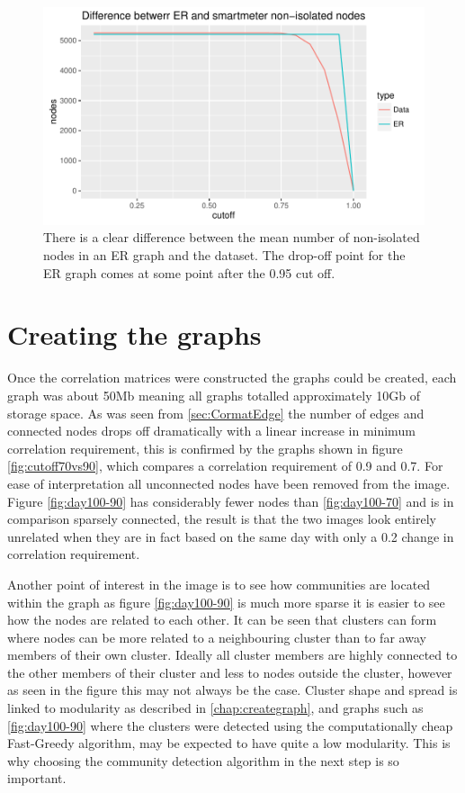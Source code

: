 \begin{figure}[ht]
    \centering
    \includegraphics{Figures/Results/DataVsER}
    \caption[ER \& Data edge comparison]{There is a clear difference between the mean number of non-isolated nodes in an ER graph and the dataset. The drop-off point for the ER graph comes at some point after the 0.95 cut off.}
    \label{fig:DataVsER}
\end{figure}

\section{Creating the graphs}
Once the correlation matrices were constructed the graphs could be created, each graph was about 50Mb meaning all graphs totalled approximately 10Gb of storage space. As was seen from \ref{sec:CormatEdge} the number of edges and connected nodes drops off dramatically with a linear increase in minimum correlation requirement, this is confirmed by the graphs shown in figure \ref{fig:cutoff70vs90}, which compares a correlation requirement of 0.9 and 0.7. For ease of interpretation all unconnected nodes have been removed from the image. Figure \ref{fig:day100-90} has considerably fewer nodes than \ref{fig:day100-70} and is in comparison sparsely connected, the result is that the two images look entirely unrelated when they are in fact based on the same day with only a 0.2 change in correlation requirement. 

Another point of interest in the image is to see how communities are located within the graph as figure \ref{fig:day100-90} is much more sparse it is easier to see how the nodes are related to each other. It can be seen that clusters can form where nodes can be more related to a neighbouring cluster than to far away members of their own cluster. Ideally all cluster members are highly connected to the other members of their cluster and less to nodes outside the cluster, however as seen in the figure this may not always be the case. Cluster shape and spread is linked to modularity as described in \ref{chap:creategraph}, and graphs such as \ref{fig:day100-90} where the clusters were detected using the computationally cheap Fast-Greedy algorithm, may be expected to have quite a low modularity. This is why choosing the community detection algorithm in the next step is so important.

